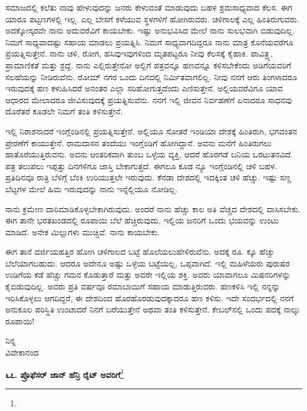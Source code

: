 ಸಮಾಜದಲ್ಲಿ ಕಲೆತು ನಾವು ಹೇಳುವುದನ್ನು ಜನರು ಕೇಳುವಂತೆ ಮಾಡುವುದು ಬಹಳ ಶ್ರಮಸಾಧ್ಯವಾದ ಕೆಲಸ. ಈಗ ಯಾರೂ ಪಟ್ಟಣಗಳಲ್ಲಿ ಇಲ್ಲ. ಎಲ್ಲ ಬೇಸಗೆ ಕಳೆಯುವ ಸ್ಥಳಗಳಿಗೆ ಹೋಗಿರುವರು. ಚಳಿಗಾಲಕ್ಕೆ ಎಲ್ಲ ಹಿಂತಿರುಗುವರು. ಅದಕ್ಕೋಸ್ಕರವೇ ನಾನು ಅದುವರೆವಿಗೆ ಕಾಯಬೇಕು. ಇಷ್ಟು ಅನುಭವಿಸಿದ ಮೇಲೆ ನಾನು ಸುಲಭವಾಗಿ ಬಿಡುವುದಿಲ್ಲ. ನಿಮಗೆ ಸಾಧ್ಯವಾದಷ್ಟು ಸಹಾಯ ಮಾಡಲು ಪ್ರಯತ್ನಿಸಿ. ನಿಮಗೆ ಸಾಧ್ಯವಾಗದಿದ್ದರೂ ನಾನು ಮಾತ್ರ ಕೊನೆಯವರೆಗೂ ಪ್ರಯತ್ನಿಸುತ್ತೇನೆ. ನಾನು ಚಳಿ, ರೋಗ, ಹಸಿವು\enginline{-}ಇವುಗಳಿಂದ ಮೃತಪಟ್ಟರೂ ನೀವು ಕೆಲಸಕ್ಕೆ ಕೈಹಾಕಿ. ಪಾವಿತ್ರ್ಯ, ಪ್ರಾಮಾಣಿಕತೆ ಮತ್ತು ಶ್ರದ್ದೆ. ನಾನು ಎಲ್ಲಿರುತ್ತೇನೋ ಅಲ್ಲಿಗೆ ಪತ್ರವನ್ನೂ ಹಣವನ್ನೂ ಕಳಿಸಬೇಕೆಂದು ಅಡಿಗೆಯವರಿಗೆ ಸಲಹೆಯನ್ನು ನೀಡಿರುವೆನು. ರೋಮ್ ನಗರ ಒಂದು ದಿನದಲ್ಲಿ ನಿರ್ಮಿತವಾಗಲಿಲ್ಲ. ನೀವು ನನಗೆ ಆರು ತಿಂಗಳಾದರೂ ಇರುವುದಕ್ಕೆ ಹಣ ಕಳುಹಿಸಿದರೆ ಅನಂತರ ಎಲ್ಲಾ ಸರಿಹೋಗುತ್ತದೆಂದು ಎಣಿಸುತ್ತೇನೆ. ಅಲ್ಲಿಯವರೆವಿಗೂ ಯಾವ ಆಧಾರದ ಮೇಲಾದರೂ ಜೀವಿಸುವುದಕ್ಕೆ ಪ್ರಯತ್ನಿಸುವೆನು. ನನಗೆ ಇಲ್ಲಿ ಜೀವನ ನಿರ್ವಹಣೆಗೆ ಏನಾದರೂ ಸಾಧನವು ದೊರೆತರೆ ಕೂಡಲೇ ನಿಮಗೆ ತಂತಿ ಕಳಿಸುತ್ತೇನೆ.

ಇಲ್ಲಿ ನಿರಾಶನಾದರೆ ಇಂಗ್ಲೆಂಡಿನಲ್ಲಿ ಪ್ರಯತ್ನಿಸುತ್ತೇನೆ. ಅಲ್ಲಿಯೂ ಸೋತರೆ ಇಂಡಿಯಾ ದೇಶಕ್ಕೆ ಹಿಂತಿರುಗಿ, ಭಗವಂತನ ಪ್ರೇರಣೆಗೆ ಕಾಯುತ್ತೇನೆ. ರಾಮದಾಸನ ತಂದೆಯು ಇಂಗ್ಲೆಂಡಿಗೆ ಹೋಗಿದ್ದಾನೆ. ಅವನು ಮನೆಗೆ ಹಿಂತಿರುಗಲು ಹಾತೊರೆಯುತ್ತಿರುವನು. ಅವನು ಆಂತರಿಕವಾಗಿ ತುಂಬ ಒಳ್ಳೆಯ ವ್ಯಕ್ತಿ, ಆದರೆ ಹೊರಗಡೆ ಬನಿಯ ಒರಟುತನವಿದೆ. ಪತ್ರ ತಲುಪಲು ಇಪ್ಪತ್ತು ದಿನಗಳಿಗೂ ಜಾಸ್ತಿ ಬೇಕಾಗುತ್ತದೆ. ಈಗಲೂ ಕೂಡ ನ್ಯೂ ಇಂಗ್ಲೆಂಡಿನಲ್ಲಿ ಚಳಿ ಬಹಳ. ಪ್ರತಿದಿನವೂ ರಾತ್ರಿ ಬೆಳಿಗ್ಗೆ ಬೆಂಕಿ ಉರಿಯುತ್ತಲೇ ಇರುವುದು. ಕೆನಡಾ ದೇಶದಲ್ಲಿ ಇದಕ್ಕಿಂತ ಚಳಿ ಹೆಚ್ಚು. ಇಷ್ಟು ಸಣ್ಣ ಬೆಟ್ಟಗಳ ಮೇಲೆ ಹಿಮ ಇರುವುದನ್ನು ನಾನು ಇನ್ನೆಲ್ಲಿಯೂ ನೋಡಿಲ್ಲ.

ನಾನು ಕ್ರಮೇಣ ದಾರಿಮಾಡಿಕೊಳ್ಳಬೇಕಾಗಿರುವುದು. ಅಂದರೆ ನಾನು ಹೆಚ್ಚು ಕಾಲ ಅತಿ ವೆಚ್ಚದ ದೇಶದಲ್ಲಿ ವಾಸಿಸಬೇಕು. ಈಗ ತಾನೇ ಭರತಖಂಡದಲ್ಲಿ ರೂಪಾಯಿ ಬೆಲೆ ಹೆಚ್ಚಿರುವುದು, ಇಲ್ಲಿಯ ಜನರಿಗೆ ಒಂದು ಭಯವನ್ನು ಉಂಟು ಮಾಡಿದೆ. ಅನೇಕ ಮಿಲ್ಲುಗಳು ಮುಚ್ಚಿವೆ. ನಾನು ಕಾಯಬೇಕು.

ಈಗ ತಾನೆ ದರ್ಜಿಯಹತ್ತಿರ ಹೋಗಿ ಚಳಿಗಾಲದ ಬಟ್ಟೆ ಹೊಲೆಯಲುಹೇಳಿರುವೆನು. ಅದಕ್ಕೆ ರೂ.  ಕ್ಕೂ ಹೆಚ್ಚು ಬೆಲೆಯಾಗಬಹುದು. ಆದರೂ ಅದೇನೂ ಅಷ್ಟು ಒಳ್ಳೆಯ ಬಟ್ಟೆಯಲ್ಲ, ಒಪ್ಪವಾಗಿದೆ. ಇಲ್ಲಿ ಮಹಿಳೆಯರು ಪುರುಷರ ಉಡಿಗೆಯ ಕಡೆ ಹೆಚ್ಚು ಗಮನ ಕೊಡುತ್ತಾರೆ ಮತ್ತು ಅವರೇ ಇಲ್ಲಿಯ ಶಕ್ತಿ. ಅವರು ಯಾವಾಗಲೂ ಮಿಷನರಿಗಳನ್ನು ಕೈಬಿಡುವುದಿಲ್ಲ. ಅವರು ಪ್ರತಿ ವರ್ಷವೂ ರಮಾಬಾಯಿಗೆ ಸಹಾಯ ಮಾಡುತ್ತಿರುವರು. ಹಣಕಳಿಸಿ ಇಲ್ಲಿ ನನ್ನನ್ನು ಇರಿಸಿಕೊಳ್ಳಲು ಆಗದಿದ್ದರೆ, ಈ ದೇಶದಿಂದ ಹೊರಹೊರಡುವುದಕ್ಕಾದರೂ ಹಣ ಕಳಿಸು. ಇದೇ ಸಂದರ್ಭದಲ್ಲಿ ನನಗೆ ಅನುಕೂಲ ಪರಿಸ್ಥಿತಿ ಉಂಟಾದರೆ ನಿನಗೆ ಬರೆಯುತ್ತೇನೆ ಅಥವಾ ತಂತಿ ಕಳಿಸುತ್ತೇನೆ. ಕೇಬಲ್‌ನಲ್ಲಿ ಒಂದು ಪದಕ್ಕೆ ನಾಲ್ಕು ರೂಪಾಯಿ!

\vspace{-0.45cm}

{\flushright
ನಿನ್ನ\\ವಿವೇಕಾನಂದ\par}

\begin{center}
\textbf{೬೭. ಪ್ರೊಫೆಸರ್ ಜಾನ್ ಹೆನ್ರಿ ರೈಟ್ ಅವರಿಗೆ}\footnote{}
\end{center}


